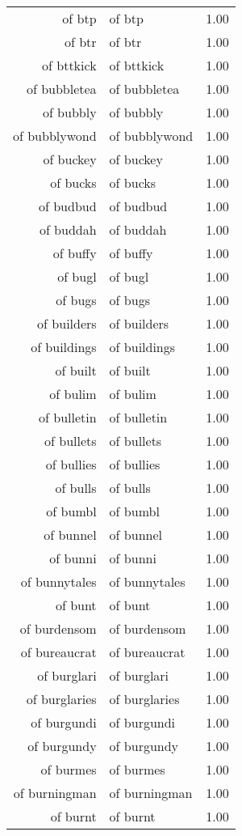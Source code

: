 \begin{table}[ht]
\begin{tabular}{rlr}
  of btp & of btp & 1.00 \\ 
  of btr & of btr & 1.00 \\ 
  of bttkick & of bttkick & 1.00 \\ 
  of bubbletea & of bubbletea & 1.00 \\ 
  of bubbly & of bubbly & 1.00 \\ 
  of bubblywond & of bubblywond & 1.00 \\ 
  of buckey & of buckey & 1.00 \\ 
  of bucks & of bucks & 1.00 \\ 
  of budbud & of budbud & 1.00 \\ 
  of buddah & of buddah & 1.00 \\ 
  of buffy & of buffy & 1.00 \\ 
  of bugl & of bugl & 1.00 \\ 
  of bugs & of bugs & 1.00 \\ 
  of builders & of builders & 1.00 \\ 
  of buildings & of buildings & 1.00 \\ 
  of built & of built & 1.00 \\ 
  of bulim & of bulim & 1.00 \\ 
  of bulletin & of bulletin & 1.00 \\ 
  of bullets & of bullets & 1.00 \\ 
  of bullies & of bullies & 1.00 \\ 
  of bulls & of bulls & 1.00 \\ 
  of bumbl & of bumbl & 1.00 \\ 
  of bunnel & of bunnel & 1.00 \\ 
  of bunni & of bunni & 1.00 \\ 
  of bunnytales & of bunnytales & 1.00 \\ 
  of bunt & of bunt & 1.00 \\ 
  of burdensom & of burdensom & 1.00 \\ 
  of bureaucrat & of bureaucrat & 1.00 \\ 
  of burglari & of burglari & 1.00 \\ 
  of burglaries & of burglaries & 1.00 \\ 
  of burgundi & of burgundi & 1.00 \\ 
  of burgundy & of burgundy & 1.00 \\ 
  of burmes & of burmes & 1.00 \\ 
  of burningman & of burningman & 1.00 \\ 
  of burnt & of burnt & 1.00 \\ 

\end{tabular}
\end{table}
